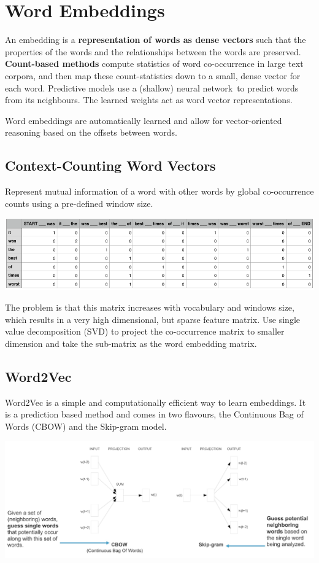 \documentclass[11pt]{article}
\begin{document}
\section{Word Embeddings}
An embedding is a \textbf{representation of words as dense vectors} such that the properties of the words and the relationships between the words are preserved. \textbf{Count-based methods} compute statistics of word co-occurrence in large text corpora, and then map these count-statistics down to a small, dense vector for each word. Predictive models use a (shallow) neural network to predict
words from its neighbours. The learned weights act as word vector representations.

Word embeddings are automatically learned and allow for vector-oriented reasoning based on the offsets between words.

\subsection{Context-Counting Word Vectors}
Represent mutual information of a word with other words by global co-occurrence counts using a pre-defined window size.
\begin{center}
	\includegraphics[width=0.8\linewidth]{img/context_counting}
\end{center}
The problem is that this matrix increases with vocabulary and windows size, which results in a very high dimensional, but sparse feature matrix. Use single value decomposition (SVD) to project the co-occurrence matrix to smaller dimension and take the sub-matrix as the word embedding matrix.

\subsection{Word2Vec}
Word2Vec is a simple and computationally efficient way to learn embeddings. It is a prediction based method and comes in two flavours, the Continuous Bag of Words (CBOW) and the Skip-gram model.
\begin{center}
	\includegraphics[width=0.8\linewidth]{img/word2vec_model}
\end{center}
\end{document}
